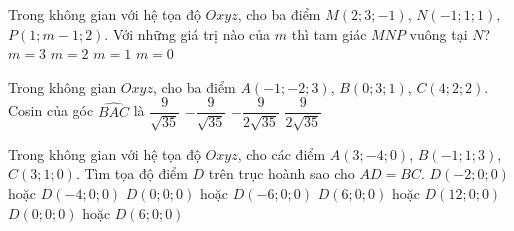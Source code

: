 \begin{ex}%
	Trong không gian với hệ tọa độ $Oxyz$, cho ba điểm $M(2;3;-1 )$, $N(-1;1;1 )$, $P(1;m-1;2 )$. Với những giá trị nào của $m$ thì tam giác $MNP$ vuông tại $N$?
	\choice 
	{ $m=3$ }
	{ $m=2$ }
	{ $m=1$ }
	{ \True $m=0$ } 
\end{ex}
\begin{ex}%
	Trong không gian $Oxyz$, cho ba điểm $A(-1;-2;3)$, $B(0;3;1)$, $C(4;2;2)$. Cosin của góc $\widehat{BAC}$ là
	\choice
	{$\dfrac{9}{\sqrt{35}}$}
	{$-\dfrac{9}{\sqrt{35}}$}
	{$-\dfrac{9}{2\sqrt{35}}$}
	{\True $\dfrac{9}{2\sqrt{35}}$}
\end{ex}
\begin{ex}%
	Trong không gian với hệ tọa độ $Oxyz$, cho các điểm $A(3;-4;0)$, $B(-1;1;3)$, $C(3;1;0)$. Tìm tọa độ điểm $D$ trên trục hoành sao cho $AD=BC$.
	\choice 
	{$D(-2;0;0)$ hoặc $D(-4;0;0)$}
	{$D(0;0;0)$ hoặc $D(-6;0;0)$}
	{$D(6;0;0)$ hoặc $D(12;0;0)$}
	{\True $D(0;0;0)$ hoặc $D(6;0;0)$}
\end{ex}
